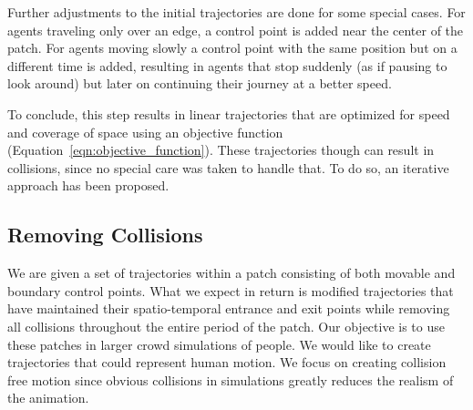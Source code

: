 Further adjustments to the initial trajectories are done for some special cases.
For agents traveling only over an edge, a control point is added near the center of the patch.
For agents moving slowly a control point with the same position but on a different time is added, resulting in agents that stop suddenly (as if pausing to look around) but later on continuing their journey at a better speed.

 
 To conclude, this step results in linear trajectories that are optimized for speed and coverage of space using an objective function (Equation~\ref{eqn:objective_function}).
 These trajectories though can result in collisions, since no special care was taken to handle that.
 To do so, an iterative approach has been proposed.

% 
% 
% 
% 
% 
% 
%  
% 

\subsection{Removing Collisions}
\label{sec:method:remove-collisions}


We are given a set of trajectories within a patch consisting of both movable and boundary control points. What we expect in return is modified trajectories that have maintained their spatio-temporal entrance and exit points while removing all collisions throughout the entire period of the patch. Our objective is to use these patches in larger crowd simulations of people. We would like to create trajectories that could represent human motion. We focus on creating collision free motion since obvious collisions in simulations greatly reduces the realism of the animation.





